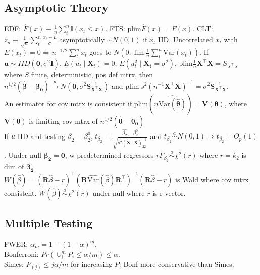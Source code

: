 \subsection*{Asymptotic Theory}
EDF: $\hat{F}(x) \equiv \frac{1}{n}\sum_{t}^{n} \mathbb{I}(x_t \leq x)$.
FTS: $\text{plim} \hat{F}(x) = F(x)$.
CLT: $z_n \equiv \frac{1}{\sqrt{n}}\sum_{t}^{n} \frac{x_t - \mu}{\sigma}$ asymptotically $\sim N(0,1)$ if $x_t$ IID.
Uncorrelated $x_t$ with $E(x_t) = 0 \Rightarrow n^{-1/2} \sum_{t}^{n} x_t$ goes to $N(0, \lim \frac{1}{n} \sum_{t}^{n} \text{Var}(x_t))$.
If $\mathbf{u} \sim IID(\mathbf{0}, \sigma^2 \mathbf{I})$, $E(u_t \mid \mathbf{X}_t) = 0$, $E(u_t ^2 \mid \mathbf{X_t} = \sigma^2)$, $\text{plim}\frac{1}{n}\mathbf{X^{\top}X} = S_{X^{\top}X}$ where $S$ finite, deterministic, pos def mtrx, then $n^{1/2}(\mathbf{\hat{\beta} - \beta_0}) \xrightarrow{d} N(\mathbf{0}, \sigma^2 \mathbf{S}^{-1}_{\mathbf{X^{\top}X}})$ and $\text{plim}\;s^2 (n^{-1}\mathbf{X^{\top}X})^{-1} = \sigma^2 \mathbf{S}^{-1}_{\mathbf{X^{\top}X}}$.\\
An estimator for cov mtrx is consistent if $\text{plim} (n \widehat{\text{Var}(\mathbf{\hat{\theta}})}) = \mathbf{V(\theta)}$, where $\mathbf{V(\theta)}$ is limiting cov mtrx of $n^{1/2}(\mathbf{\hat{\theta} - \theta_0})$\\
If $u$ IID and testing $\beta_2 = \beta_2 ^0$, $t_{\beta_2} = \frac{\hat{\beta_2}-\beta_2^{0}}{\sqrt {s^2 (\mathbf{X^{\top}X})^{-1}_{22}}}$ and $t_{\beta_2} \stackrel{a}{\sim} N(0,1) \Rightarrow t_{\beta_2} = O_p (1)$.
Under null $\mathbf{\beta_2} = \mathbf{0}$, w predetermined regressors $rF_{\beta_2} \stackrel{a}{\sim} \chi^2 (r) $ where $r = k_2$ is dim of $\mathbf{\beta_2}$.\\
$W(\hat{\beta}) = (\mathbf{R}\hat{\beta} - r)^{\top}(\mathbf{R}\widehat{\text{Var}}(\hat{\beta})\mathbf{R}^{\top})^{-1}(\mathbf{R}\hat{\beta} - r)$ is Wald where cov mtrx consistent.
$W(\hat{\beta}) \stackrel{a}{\sim} \chi^2 (r)$ under null where $r$ is r-vector.
\subsection*{Multiple Testing}
FWER: $\alpha_m = 1 - (1-\alpha)^m$.\\
Bonferroni: $Pr(\cup_{i}^{m} P_i \leq \alpha / m) \leq \alpha$.\\
Simes: $P_{(j)} \leq j \alpha / m$ for increasing $P$.
Bonf more conservative than Simes.
